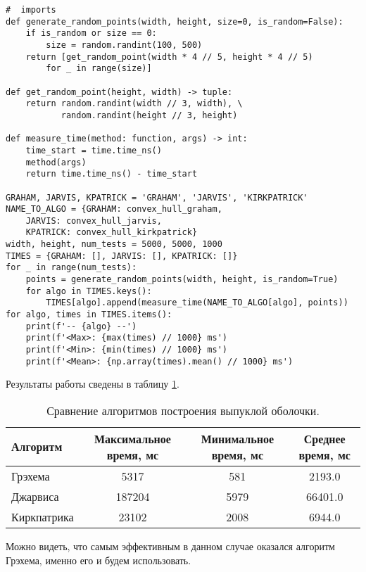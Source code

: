 \begin{verbatim}
#  imports
def generate_random_points(width, height, size=0, is_random=False):
    if is_random or size == 0:
        size = random.randint(100, 500)
    return [get_random_point(width * 4 // 5, height * 4 // 5) 
    	for _ in range(size)]

def get_random_point(height, width) -> tuple:
    return random.randint(width // 3, width), \
           random.randint(height // 3, height)

def measure_time(method: function, args) -> int:
    time_start = time.time_ns()
    method(args)
    return time.time_ns() - time_start

GRAHAM, JARVIS, KPATRICK = 'GRAHAM', 'JARVIS', 'KIRKPATRICK'
NAME_TO_ALGO = {GRAHAM: convex_hull_graham, 
	JARVIS: convex_hull_jarvis, 
	KPATRICK: convex_hull_kirkpatrick}
width, height, num_tests = 5000, 5000, 1000
TIMES = {GRAHAM: [], JARVIS: [], KPATRICK: []}
for _ in range(num_tests):
    points = generate_random_points(width, height, is_random=True)
    for algo in TIMES.keys():
        TIMES[algo].append(measure_time(NAME_TO_ALGO[algo], points))
for algo, times in TIMES.items():
    print(f'-- {algo} --')
    print(f'<Max>: {max(times) // 1000} ms')
    print(f'<Min>: {min(times) // 1000} ms')
    print(f'<Mean>: {np.array(times).mean() // 1000} ms')
\end{verbatim}

Результаты работы сведены в таблицу \ref{table-compare-hull}.

\begin{table}[h]
\begin{center}
\begin{tabular}{|l|c|c|c|}
\hline Алгоритм & Максимальное время, мс &
Минимальное время, мс & Среднее время, мс\\
\hline  Грэхема &  5317 & 581 & 2193.0 \\
\hline  Джарвиса & 187204 & 5979 & 66401.0 \\
\hline  Киркпатрика & 23102 & 2008  & 6944.0 \\
\hline
\end{tabular}
\end{center}
\caption{\label{table-compare-hull} Сравнение алгоритмов построения
выпуклой оболочки.}
\end{table}

Можно видеть, что самым эффективным в данном случае оказался алгоритм
Грэхема, именно его и будем использовать.

